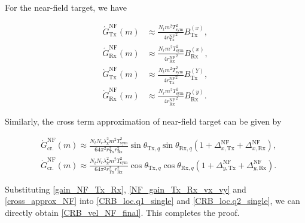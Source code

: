 \documentclass[9pt,final,journal,twocolumn]{IEEEtran}
\begin{document}
For the near-field target, we have 
\begin{small}
\begin{subequations} \label{NF_gain_Tx_Rx_vx_vy}
 \begin{align} 
   \acute{G}_{\mathrm{Tx}}^{\mathrm{NF}}(m) & \approx 
\frac{N_t m^{2} T_{\mathrm{sym}}^{2}}{4{r_{\mathrm{Tx}}^{\mathrm{NF}}}^{2}}
B_{\mathrm{Tx}}^{(x)}, \label{NF_approx_gain_Tx_vx}\\ 
   \acute{G}_{\mathrm{Rx}}^{\mathrm{NF}}(m) & \approx \frac{N_r m^{2} T_{\mathrm{sym}}^{2}}{4{r_{\mathrm{Rx}}^{\mathrm{NF}}}^{2}}
B_{\mathrm{Rx}}^{(x)}, \label{NF_approx_gain_Rx_vx}\\
   \grave{G}_{\mathrm{Tx}}^{\mathrm{NF}}(m) & \approx \frac{N_t m^{2} T_{\mathrm{sym}}^{2}}{4{r_{\mathrm{Tx}}^{\mathrm{NF}}}^{2}}
B_{\mathrm{Tx}}^{(Y)}, \label{NF_approx_gain_Tx_vy}\\ 
   \grave{G}_{\mathrm{Rx}}^{\mathrm{NF}}(m) & \approx \frac{N_r m^{2} T_{\mathrm{sym}}^{2}}{4{r_{\mathrm{Rx}}^{\mathrm{NF}}}^{2}}
B_{\mathrm{Rx}}^{(y)}. \label{NF_approx_gain_Rx_vy}
 \end{align}   
\end{subequations}
\end{small}
\noindent\hspace{-0.5em}Similarly, the cross term approximation of near-field target can be given by 
\begin{small}
\begin{subequations} \label{cross_approx_NF}
\begin{align} 
&\acute{G}_{\mathrm{cr.}}^{\mathrm{NF}}(m) \!\approx\! \frac{N_t N_r \lambda_k^{2} m^{2} T_{\mathrm{sym}}^{2}}
{64 \pi^{2} r_{\mathrm{Tx}}^{2} r_{\mathrm{Rx}}^{2}}
\sin\theta_{\mathrm{Tx},q}\sin\theta_{\mathrm{Rx},q}\left(1\!+\!\Delta_{x,\mathrm{Tx}}^{\mathrm{NF}}\!+\!\Delta_{x,\mathrm{Rx}}^{\mathrm{NF}}
\right)
,\\
& \grave{G}_{\mathrm{cr.}}^{\mathrm{NF}}(m) \!\approx\! \frac{N_t N_r \lambda_k^{2} m^{2} T_{\mathrm{sym}}^{2}}
{64 \pi^{2} r_{\mathrm{Tx}}^{2} r_{\mathrm{Rx}}^{2}}
\cos\theta_{\mathrm{Tx},q}\cos\theta_{\mathrm{Rx},q}\left(1\!+\!\Delta_{y,\mathrm{Tx}}^{\mathrm{NF}}\!+\!\Delta_{y,\mathrm{Rx}}^{\mathrm{NF}}\right).
\end{align}
\end{subequations}
\end{small}
\noindent\hspace{-0.5em}Substituting \eqref{gain_NF_Tx_Rx}, \eqref{NF_gain_Tx_Rx_vx_vy} and \eqref{cross_approx_NF} into \eqref{CRB_loc.q1_single} and \eqref{CRB_loc.q2_single}, we can directly obtain \eqref{CRB_vel_NF_final}. This completes the proof.



\ifCLASSOPTIONcaptionsoff
  \newpage
\fi





\ifCLASSOPTIONcaptionsoff
  \newpage
\fi
\end{document}
